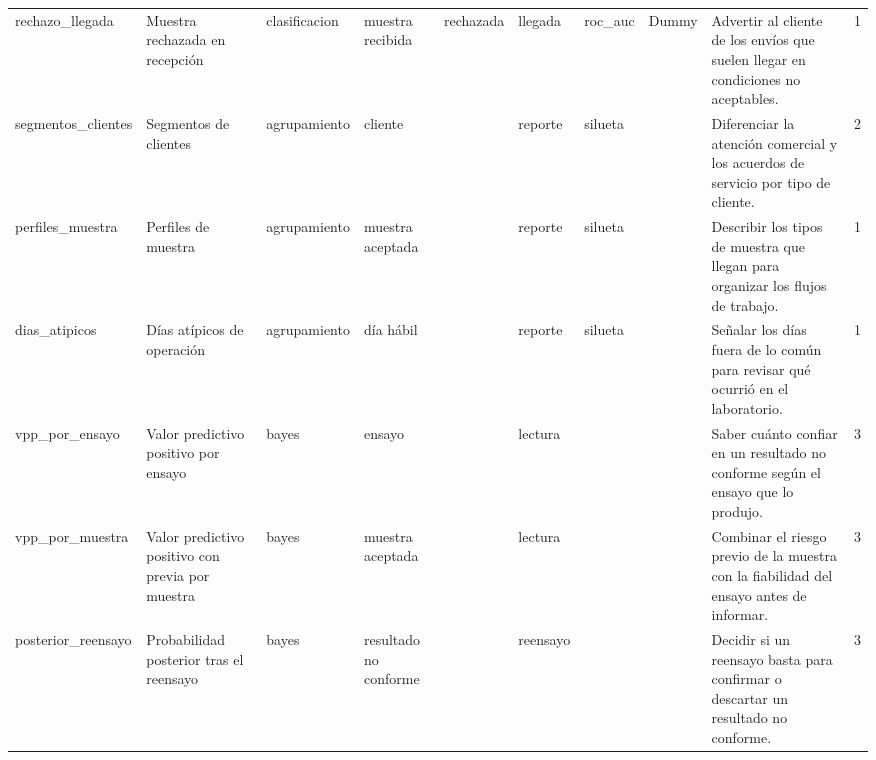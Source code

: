 \begin{tabular}{lllllllllr}
rechazo\_llegada & Muestra rechazada en recepción & clasificacion & muestra recibida & rechazada & llegada & roc\_auc & Dummy & Advertir al cliente de los envíos que suelen llegar en condiciones no aceptables. & 1 \\
segmentos\_clientes & Segmentos de clientes & agrupamiento & cliente &  & reporte & silueta &  & Diferenciar la atención comercial y los acuerdos de servicio por tipo de cliente. & 2 \\
perfiles\_muestra & Perfiles de muestra & agrupamiento & muestra aceptada &  & reporte & silueta &  & Describir los tipos de muestra que llegan para organizar los flujos de trabajo. & 1 \\
dias\_atipicos & Días atípicos de operación & agrupamiento & día hábil &  & reporte & silueta &  & Señalar los días fuera de lo común para revisar qué ocurrió en el laboratorio. & 1 \\
vpp\_por\_ensayo & Valor predictivo positivo por ensayo & bayes & ensayo &  & lectura &  &  & Saber cuánto confiar en un resultado no conforme según el ensayo que lo produjo. & 3 \\
vpp\_por\_muestra & Valor predictivo positivo con previa por muestra & bayes & muestra aceptada &  & lectura &  &  & Combinar el riesgo previo de la muestra con la fiabilidad del ensayo antes de informar. & 3 \\
posterior\_reensayo & Probabilidad posterior tras el reensayo & bayes & resultado no conforme &  & reensayo &  &  & Decidir si un reensayo basta para confirmar o descartar un resultado no conforme. & 3 \\
\bottomrule
\end{tabular}
